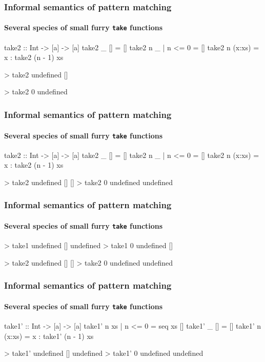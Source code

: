 \documentclass{beamer}
\begin{document}
\begin{frame}[fragile]
  \frametitle{Informal semantics of pattern matching}
  \framesubtitle{Several species of small furry \texttt{take} functions}

  \begin{code}
take2 :: Int -> [a] -> [a]
take2 _ []              = []
take2 n _      | n <= 0 = []
take2 n (x:xs)          = x : take2 (n - 1) xs
  \end{code}
  \begin{code}
> take2 undefined []

> take2 0 undefined

  \end{code}
\end{frame}

\begin{frame}[fragile]
  \frametitle{Informal semantics of pattern matching}
  \framesubtitle{Several species of small furry \texttt{take} functions}

  \begin{code}
take2 :: Int -> [a] -> [a]
take2 _ []              = []
take2 n _      | n <= 0 = []
take2 n (x:xs)          = x : take2 (n - 1) xs
  \end{code}
  \begin{code}
> take2 undefined []
[]
> take2 0 undefined
undefined
  \end{code}
\end{frame}

\begin{frame}[fragile]
  \frametitle{Informal semantics of pattern matching}
  \framesubtitle{Several species of small furry \texttt{take} functions}

  \begin{code}
> take1 undefined []
undefined
> take1 0 undefined
[]
  \end{code}
  \begin{code}
> take2 undefined []
[]
> take2 0 undefined
undefined
  \end{code}
\end{frame}

\begin{frame}[fragile]
  \frametitle{Informal semantics of pattern matching}
  \framesubtitle{Several species of small furry \texttt{take} functions}

  \begin{code}
take1' :: Int -> [a] -> [a]
take1' n xs     | n <= 0 = seq xs []
take1' _ []              = []
take1' n (x:xs)          = x : take1' (n - 1) xs
  \end{code}
  \begin{code}
> take1' undefined []
undefined
> take1' 0 undefined
undefined
  \end{code}
\end{frame}
\end{document}
